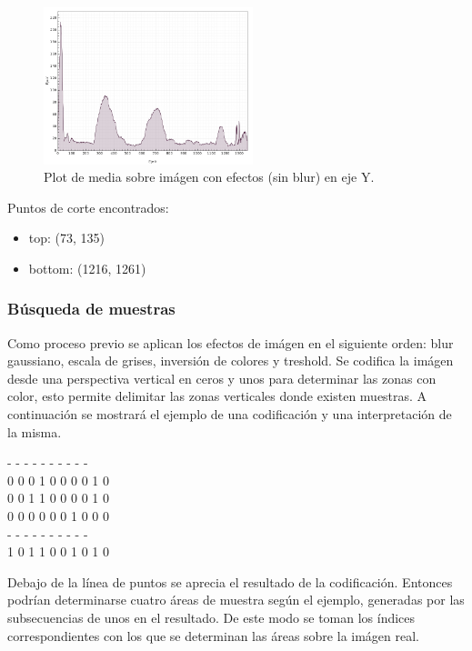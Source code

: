 \begin{figure}[H]
	\vspace{-0.2cm}
	\centering
	\includegraphics[width=230px]{imagenes-jtlc/experimento/search-cut-points/plot-y-no-blur}
	\centering
	\caption{Plot de media sobre im\'agen con efectos (sin blur) en eje Y.}
	\label{fig:font-sc-plot-y-s-blur}
	\vspace{-0.15cm}
\end{figure}

Puntos de corte encontrados:
\begin{itemize}
	\addtolength{\itemindent}{1cm}
	\item top: (73, 135)
	\item bottom: (1216, 1261)
\end{itemize}

\newpage
\subsubsection{B\'usqueda de muestras}
Como proceso previo se aplican los efectos de im\'agen en el siguiente orden: blur gaussiano, escala de grises, inversi\'on de colores y treshold. Se codifica la im\'agen desde una perspectiva vertical en ceros y unos para determinar las zonas con color, esto permite delimitar las zonas verticales donde existen muestras. A continuaci\'on se mostrar\'a el ejemplo de una codificaci\'on y una interpretaci\'on de la misma.

\begin{center}
- - - - - - - - - -\\
0 0 0 1 0 0 0 0 1 0\\
0 0 1 1 0 0 0 0 1 0\\
0 0 0 0 0 0 1 0 0 0\\
- - - - - - - - - -\\
1 0 1 1 0 0 1 0 1 0\\
\end{center}

Debajo de la l\'inea de puntos se aprecia el resultado de la codificaci\'on. Entonces podr\'ian determinarse cuatro \'areas de muestra seg\'un el ejemplo, generadas por las subsecuencias de unos en el resultado. De este modo se toman los \'indices correspondientes con los que se determinan las \'areas sobre la im\'agen real. 

